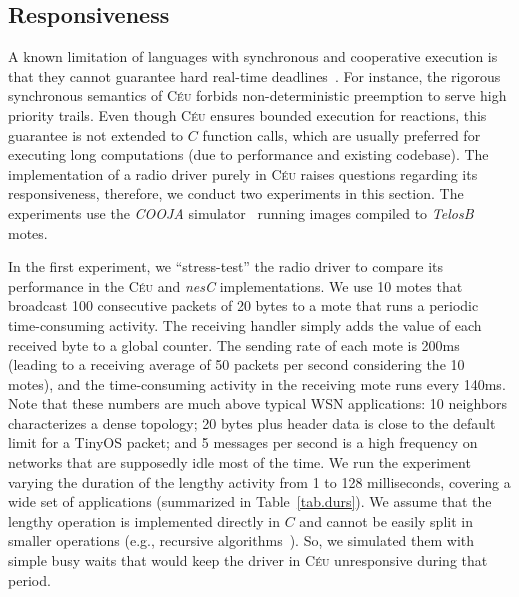 \documentclass[letterpaper]{sig-alternate}
\newcommand{\CEU}{\textsc{C\'{e}u}\xspace}
\begin{document}
\subsection{Responsiveness}
\label{sec.eval.radio}

A known limitation of languages with synchronous and cooperative execution is 
that they cannot guarantee hard real-time 
deadlines~\cite{wsn.comparison,wsn.tosthreads}.
%
For instance, the rigorous synchronous semantics of \CEU forbids 
non-deterministic preemption to serve high priority trails.
%
Even though \CEU ensures bounded execution for reactions, this guarantee is not 
extended to $C$ function calls, which are usually preferred for executing long 
computations (due to performance and existing codebase).
%
%
The implementation of a radio driver purely in \CEU raises questions
regarding its responsiveness, therefore, we conduct two experiments in this 
section.
%
The experiments use the \emph{COOJA} simulator~\cite{wsn.cooja} running images 
compiled to \emph{TelosB} motes.

In the first experiment, we ``stress-test'' the radio driver to compare its 
performance in the \CEU and \emph{nesC} implementations.
We use 10 motes that broadcast 100 consecutive packets of 20 bytes to a mote 
that runs a periodic time-consuming activity.
The receiving handler simply adds the value of each received byte to a global 
counter.
%
The sending rate of each mote is 200ms (leading to a receiving average of 50 
packets per second considering the 10 motes), and the time-consuming activity 
in the receiving mote runs every 140ms.
%
Note that these numbers are much above typical WSN applications: 10 neighbors 
characterizes a dense topology; 20 bytes plus header data is close to the 
default limit for a TinyOS packet; and 5 messages per second is a high 
frequency on networks that are supposedly idle most of the time.
%
We run the experiment varying the duration of the lengthy activity from 1 to 
128 milliseconds, covering a wide set of applications (summarized in 
Table~\ref{tab.durs}).
%
We assume that the lengthy operation is implemented directly in $C$ and cannot 
be easily split in smaller operations (e.g., recursive 
algorithms~\cite{wsn.comparison,wsn.tosthreads}).
So, we simulated them with simple busy waits that would keep the driver in \CEU 
unresponsive during that period.
\end{document}
